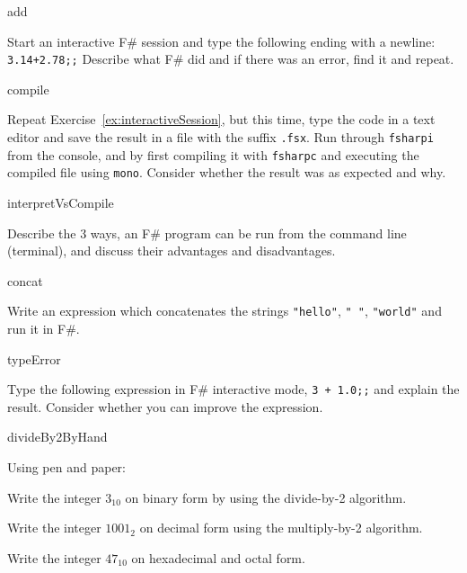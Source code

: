 
\begin{defproblem}{add}
  \begin{onlyproblem}%
    \label{ex:interactiveSession}
    Start an interactive F\# session and type the following ending with a newline: \lstinline{3.14+2.78;;} Describe what F\# did and if there was an error, find it and repeat.
  \end{onlyproblem}
\end{defproblem}

\begin{defproblem}{compile}
  \begin{onlyproblem}%
    Repeat Exercise~\ref{ex:interactiveSession}, but this time, type the code in a text editor and save the result in a file with the suffix \texttt{.fsx}. Run through \lstinline[language=console]{fsharpi} from the console, and by first compiling it with \lstinline[language=console]{fsharpc} and executing the compiled file using \lstinline[language=console]{mono}. Consider whether the result was as expected and why.
  \end{onlyproblem}
\end{defproblem}

\begin{defproblem}{interpretVsCompile}
  \begin{onlyproblem}%
    Describe the 3 ways, an F\# program can be run from the command line (terminal), and discuss their advantages and disadvantages.
  \end{onlyproblem}
\end{defproblem}

\begin{defproblem}{concat}
  \begin{onlyproblem}%
    Write an expression which concatenates the strings \lstinline{"hello"}, \lstinline{" "}, \lstinline{"world"} and run it in F\#.
  \end{onlyproblem}
\end{defproblem}

\begin{defproblem}{typeError}
  \begin{onlyproblem}%
    Type the following expression in F\# interactive mode, \lstinline{3 + 1.0;;} and explain the result. Consider whether you can improve the expression.
  \end{onlyproblem}
\end{defproblem}

\begin{defproblem}{divideBy2ByHand}
  \begin{onlyproblem}%
    Using pen and paper:
    \begin{textenum}
    \item Write the integer $3_{10}$ on binary form by using the divide-by-2 algorithm.
    \item Write the integer $1001_2$ on decimal form using the multiply-by-2 algorithm.
    \item Write the integer $47_{10}$ on hexadecimal and octal form.
    \end{textenum}
  \end{onlyproblem}
\end{defproblem}

